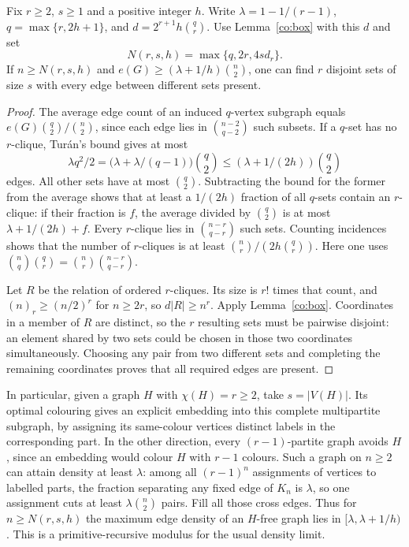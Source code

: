 \begin{theorem}\leavevmode\label{co:es}
Fix $r\ge2$, $s\ge1$ and a positive integer $h$. Write
$\lambda=1-1/(r-1)$, $q=\max\{r,2h+1\}$, and
$d=2^{r+1}h\binom qr$. Use Lemma~\ref{co:box} with this $d$ and set
\[
 N(r,s,h)=\max\{q,2r,4s d_r\}.
\]
If $n\ge N(r,s,h)$ and $e(G)\ge(\lambda+1/h)\binom n2$,
one can find $r$ disjoint sets of size $s$ with every edge between
different sets present.
\end{theorem}
\begin{proof}
The average edge count of an induced $q$-vertex subgraph equals
$e(G)\binom q2/\binom n2$, since each edge lies in
$\binom{n-2}{q-2}$ such subsets. If a $q$-set has no $r$-clique,
Tur\'an's bound gives at most
\[
 \lambda q^2/2=
 \bigl(\lambda+\lambda/(q-1)\bigr)\binom q2
 \le (\lambda+1/(2h))\binom q2
\]
edges. All other sets have at most $\binom q2$. Subtracting the bound
for the former from the average shows that at least a $1/(2h)$
fraction of all $q$-sets contain an $r$-clique: if their fraction is $f$,
the average divided by $\binom q2$ is at most
$\lambda+1/(2h)+f$. Every $r$-clique lies in
$\binom{n-r}{q-r}$ such sets. Counting incidences shows that the number
of $r$-cliques is at least $\binom nr/(2h\binom qr)$. Here one uses
$\binom nq\binom qr=\binom nr\binom{n-r}{q-r}$.

Let $R$ be the relation of ordered $r$-cliques. Its size is $r!$ times
that count, and $(n)_r\ge (n/2)^r$ for $n\ge 2r$, so $d|R|\ge n^r$.
Apply Lemma~\ref{co:box}. Coordinates in a member of $R$ are distinct,
so the $r$ resulting sets must be pairwise disjoint: an element shared by
two sets could be chosen in those two coordinates simultaneously. Choosing
any pair from two different sets and completing the remaining coordinates
proves that all required edges are present.
\end{proof}

In particular, given a graph $H$ with $\chi(H)=r\ge2$, take $s=|V(H)|$.
Its optimal colouring gives an explicit embedding into this complete
multipartite subgraph, by assigning its same-colour vertices distinct
labels in the corresponding part. In the other direction, every
$(r-1)$-partite graph avoids $H$, since an embedding would colour $H$ with
$r-1$ colours. Such a graph on $n\ge2$ can attain density at least
$\lambda$: among all $(r-1)^n$ assignments of vertices to labelled parts,
the fraction separating any fixed edge of $K_n$ is $\lambda$, so one
assignment cuts at least $\lambda\binom n2$ pairs. Fill all those cross
edges. Thus for $n\ge N(r,s,h)$ the maximum edge density of an
$H$-free graph lies in $[\lambda,\lambda+1/h)$. This is a
primitive-recursive modulus for the usual density limit.

